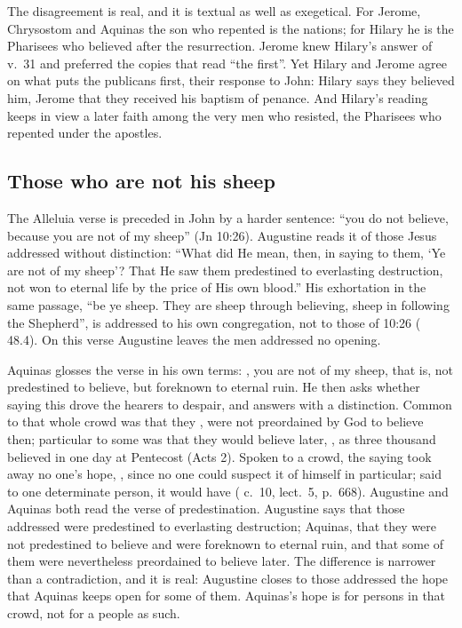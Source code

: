 The disagreement is real, and it is textual as well as exegetical. For Jerome,
Chrysostom and Aquinas the son who repented is the nations; for Hilary he is
the Pharisees who believed after the resurrection. Jerome knew Hilary's answer
of v.~31 and preferred the copies that read ``the first''. Yet Hilary and
Jerome agree on what puts the publicans first, their response to John: Hilary
says they believed him, Jerome that they received his baptism of penance. And
Hilary's reading keeps in view a later faith among the very men who resisted,
the Pharisees who repented under the apostles.

\subsection{Those who are not his sheep}

The Alleluia verse is preceded in John by a harder sentence: ``you do not
believe, because you are not of my sheep'' (Jn 10:26). Augustine reads it of
those Jesus addressed without distinction: ``What did He mean, then, in saying
to them, `Ye are not of my sheep'? That He saw them predestined to everlasting
destruction, not won to eternal life by the price of His own blood.'' His
exhortation in the same passage, ``be ye sheep. They are sheep through
believing, sheep in following the Shepherd'', is addressed to his own
congregation, not to those of 10:26 ( 48.4). On this
verse Augustine leaves the men addressed no opening.

Aquinas glosses the verse in his own terms: , you are not of my sheep, that is, not predestined to believe, but
foreknown to eternal ruin. He then asks whether saying this drove the hearers to
despair, and answers with a distinction. Common to that whole crowd was that
they , were not
preordained by God to believe then; particular to some was that they would
believe later, , as three thousand believed in one day at Pentecost (Acts 2). Spoken
to a crowd, the saying took away no one's hope, , since no one could suspect it of himself in
particular; said to one determinate person, it would have ( c.~10, lect.~5, p.~668). Augustine and Aquinas both read the verse of
predestination. Augustine says that those addressed were predestined to
everlasting destruction; Aquinas, that they were not predestined to believe and
were foreknown to eternal ruin, and that some of them were nevertheless
preordained to believe later. The difference is narrower than a contradiction,
and it is real: Augustine closes to those addressed the hope that Aquinas keeps
open for some of them. Aquinas's hope is for persons in that crowd, not for a
people as such.

